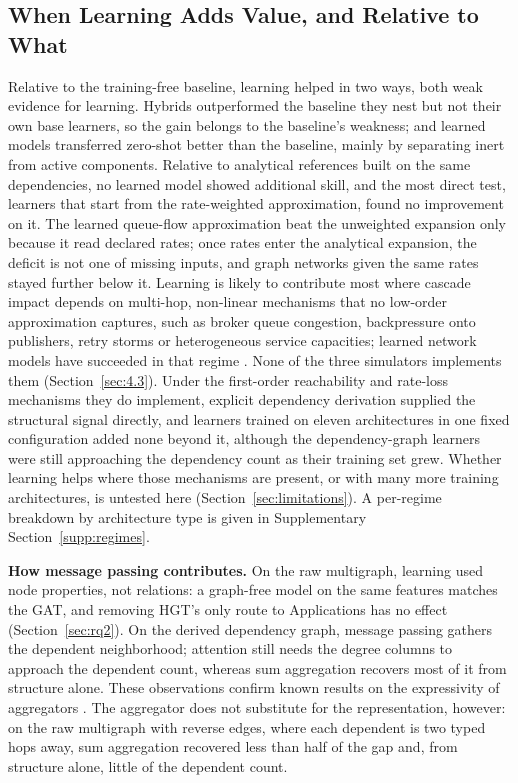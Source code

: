 \documentclass[preprint,3p]{elsarticle}
\begin{document}
\subsection{When Learning Adds Value, and Relative to What}
\label{sec:8.2}

Relative to the training-free baseline, learning helped in two ways, both weak evidence for learning. Hybrids outperformed the baseline they nest but not their own base learners, so the gain belongs to the baseline's weakness; and learned models transferred zero-shot better than the baseline, mainly by separating inert from active components. Relative to analytical references built on the same dependencies, no learned model showed additional skill, and the most direct test, learners that start from the rate-weighted approximation, found no improvement on it. The learned queue-flow approximation beat the unweighted expansion only because it read declared rates; once rates enter the analytical expansion, the deficit is not one of missing inputs, and graph networks given the same rates stayed further below it. Learning is likely to contribute most where cascade impact depends on multi-hop, non-linear mechanisms that no low-order approximation captures, such as broker queue congestion, backpressure onto publishers, retry storms or heterogeneous service capacities; learned network models have succeeded in that regime \cite{rusek2020routenet}. None of the three simulators implements them (Section~\ref{sec:4.3}). Under the first-order reachability and rate-loss mechanisms they do implement, explicit dependency derivation supplied the structural signal directly, and learners trained on eleven architectures in one fixed configuration added none beyond it, although the dependency-graph learners were still approaching the dependency count as their training set grew. Whether learning helps where those mechanisms are present, or with many more training architectures, is untested here (Section~\ref{sec:limitations}). A per-regime breakdown by architecture type is given in Supplementary Section~\ref{supp:regimes}.

\noindent\textbf{How message passing contributes.} On the raw multigraph, learning used node properties, not relations: a graph-free model on the same features matches the GAT, and removing HGT's only route to Applications has no effect (Section~\ref{sec:rq2}). On the derived dependency graph, message passing gathers the dependent neighborhood; attention still needs the degree columns to approach the dependent count, whereas sum aggregation recovers most of it from structure alone. These observations confirm known results on the expressivity of aggregators \cite{xu2019gin,corso2020pna,chen2020can}. The aggregator does not substitute for the representation, however: on the raw multigraph with reverse edges, where each dependent is two typed hops away, sum aggregation recovered less than half of the gap and, from structure alone, little of the dependent count.
\end{document}
